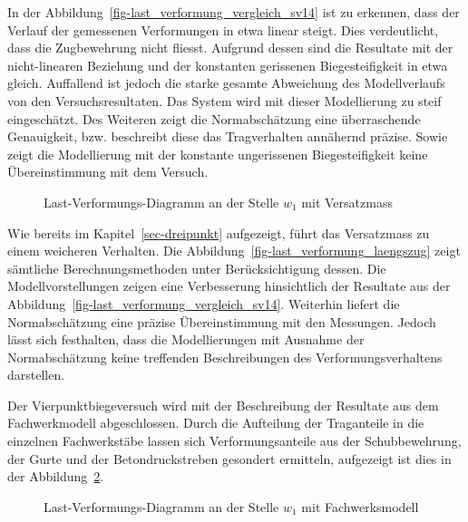 \documentclass[
  12pt,
  letterpaper,
  egregdoesnotlikesansseriftitles]{scrreprt}
\begin{document}
In der Abbildung~\ref{fig-last_verformung_vergleich_sv14} ist zu
erkennen, dass der Verlauf der gemessenen Verformungen in etwa linear
steigt. Dies verdeutlicht, dass die Zugbewehrung nicht fliesst. Aufgrund
dessen sind die Resultate mit der nicht-linearen Beziehung und der
konstanten gerissenen Biegesteifigkeit in etwa gleich. Auffallend ist
jedoch die starke gesamte Abweichung des Modellverlaufs von den
Versuchsresultaten. Das System wird mit dieser Modellierung zu steif
eingeschätzt. Des Weiteren zeigt die Normabschätzung eine überraschende
Genauigkeit, bzw. beschreibt diese das Tragverhalten annähernd präzise.
Sowie zeigt die Modellierung mit der konstante ungerissenen
Biegesteifigkeit keine Übereinstimmung mit dem Versuch.

\begin{figure}[H]


\caption{\label{fig-last_verformung_laengszug_sv14}Last-Verformungs-Diagramm
an der Stelle \(w_1\) mit Versatzmass}

\end{figure}%

Wie bereits im Kapitel~\ref{sec-dreipunkt} aufgezeigt, führt das
Versatzmass zu einem weicheren Verhalten. Die
Abbildung~\ref{fig-last_verformung_laengszug} zeigt sämtliche
Berechnungsmethoden unter Berücksichtigung dessen. Die
Modellvorstellungen zeigen eine Verbesserung hinsichtlich der Resultate
aus der Abbildung~\ref{fig-last_verformung_vergleich_sv14}. Weiterhin
liefert die Normabschätzung eine präzise Übereinstimmung mit den
Messungen. Jedoch lässt sich festhalten, dass die Modellierungen mit
Ausnahme der Normabschätzung keine treffenden Beschreibungen des
Verformungsverhaltens darstellen.

Der Vierpunktbiegeversuch wird mit der Beschreibung der Resultate aus
dem Fachwerkmodell abgeschlossen. Durch die Aufteilung der Traganteile
in die einzelnen Fachwerkstäbe lassen sich Verformungsanteile aus der
Schubbewehrung, der Gurte und der Betondruckstreben gesondert ermitteln,
aufgezeigt ist dies in der
Abbildung~\ref{fig-last_verformung_fachwerk_sv14}.

\begin{figure}[H]


\caption{\label{fig-last_verformung_fachwerk_sv14}Last-Verformungs-Diagramm
an der Stelle \(w_1\) mit Fachwerksmodell}

\end{figure}%
\end{document}
